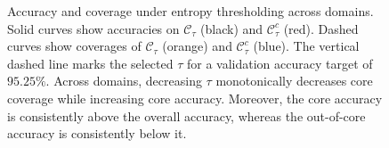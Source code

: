 \documentclass{article}
\theoremstyle{plain}
\theoremstyle{definition}
\theoremstyle{remark}
\newcommand{\cC}{\mathcal{C}}
\begin{document}
\begin{figure}[!htbp]
	\caption{
		Accuracy and coverage under entropy thresholding across domains.
		Solid curves show accuracies on $\cC_\tau$ (black) and $\cC_\tau^{c}$ (red).
		Dashed curves show coverages of $\cC_\tau$ (orange) and $\cC_\tau^{c}$ (blue).
		The vertical dashed line marks the selected $\tau$ for a validation accuracy target of $95.25\%$. Across domains, decreasing \(\tau\) monotonically decreases core coverage while increasing core accuracy. Moreover, the core accuracy is consistently above the overall accuracy, whereas the out-of-core accuracy is consistently below it.
	}
	\vspace{0.1in}
\label{fig:th_sweep}
\end{figure}
\end{document}
